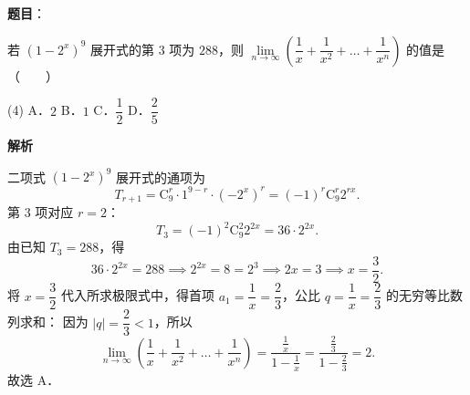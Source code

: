 \begin{answer}

\textbf{题目}：

若 $(1 - 2^x)^9$ 展开式的第 $3$ 项为 $288$，则 $\lim\limits_{n \to \infty} \left(\dfrac{1}{x} + \dfrac{1}{x^2} + \dots + \dfrac{1}{x^n}\right)$ 的值是\mbox{（　　）}

\begin{gkopts}(4)
\task A．$2$
\task B．$1$
\task C．$\dfrac{1}{2}$
\task D．$\dfrac{2}{5}$
\end{gkopts}

\textbf{解析}

二项式 $(1 - 2^x)^9$ 展开式的通项为
\nopagebreak[4]
\[
T_{r+1} = \mathrm{C}_9^r \cdot 1^{9-r} \cdot (-2^x)^r = (-1)^r \mathrm{C}_9^r 2^{rx}.
\]
第 $3$ 项对应 $r = 2$：
\nopagebreak[4]
\[
T_3 = (-1)^2 \mathrm{C}_9^2 2^{2x} = 36 \cdot 2^{2x}.
\]
由已知 $T_3 = 288$，得
\nopagebreak[4]
\[
36 \cdot 2^{2x} = 288 \implies 2^{2x} = 8 = 2^3 \implies 2x = 3 \implies x = \frac{3}{2}.
\]
将 $x = \dfrac{3}{2}$ 代入所求极限式中，得首项 $a_1 = \dfrac{1}{x} = \dfrac{2}{3}$，公比 $q = \dfrac{1}{x} = \dfrac{2}{3}$ 的无穷等比数列求和：
因为 $|q| = \dfrac{2}{3} < 1$，所以
\nopagebreak[4]
\[
\lim_{n \to \infty} \left(\frac{1}{x} + \frac{1}{x^2} + \dots + \frac{1}{x^n}\right) = \frac{\frac{1}{x}}{1 - \frac{1}{x}} = \frac{\frac{2}{3}}{1 - \frac{2}{3}} = 2.
\]
故选 A．


\end{answer}
